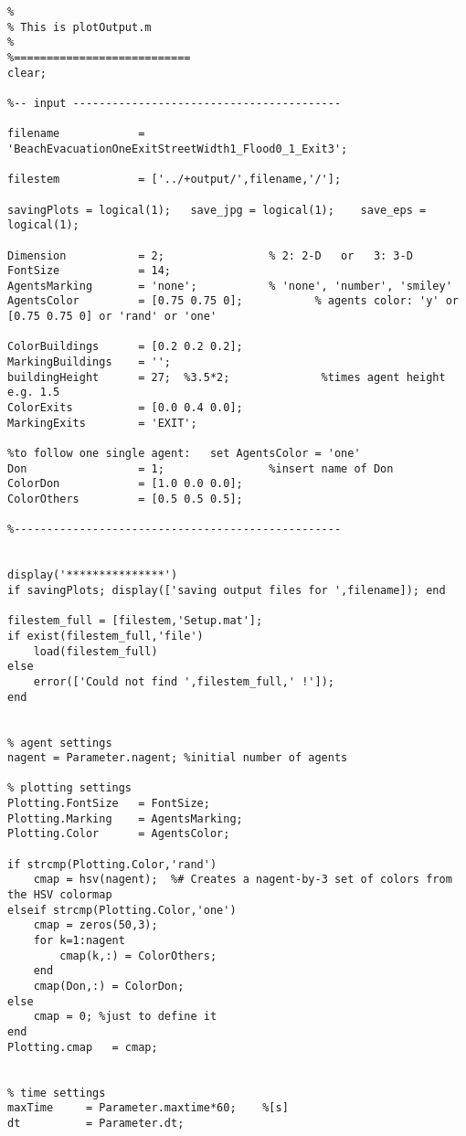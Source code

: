 \lstset{basicstyle=\footnotesize\ttfamily}
    
\begin{lstlisting}[breaklines]
%===========================
% 
% This is plotOutput.m
% 
%=========================== 
clear;

%-- input -----------------------------------------

filename            = 'BeachEvacuationOneExitStreetWidth1_Flood0_1_Exit3';

filestem            = ['../+output/',filename,'/'];

savingPlots = logical(1);   save_jpg = logical(1);    save_eps = logical(1);

Dimension           = 2;                % 2: 2-D   or   3: 3-D
FontSize            = 14;
AgentsMarking       = 'none';       	% 'none', 'number', 'smiley'
AgentsColor         = [0.75 0.75 0];           % agents color: 'y' or [0.75 0.75 0] or 'rand' or 'one'

ColorBuildings      = [0.2 0.2 0.2];
MarkingBuildings    = '';
buildingHeight      = 27;  %3.5*2;              %times agent height e.g. 1.5
ColorExits          = [0.0 0.4 0.0];
MarkingExits        = 'EXIT';

%to follow one single agent:   set AgentsColor = 'one'
Don                 = 1;                %insert name of Don
ColorDon            = [1.0 0.0 0.0];
ColorOthers         = [0.5 0.5 0.5];

%--------------------------------------------------


display('***************')
if savingPlots; display(['saving output files for ',filename]); end

filestem_full = [filestem,'Setup.mat'];
if exist(filestem_full,'file')
    load(filestem_full)
else
    error(['Could not find ',filestem_full,' !']);
end


% agent settings
nagent = Parameter.nagent; %initial number of agents

% plotting settings
Plotting.FontSize	= FontSize;
Plotting.Marking  	= AgentsMarking;
Plotting.Color    	= AgentsColor;

if strcmp(Plotting.Color,'rand')
    cmap = hsv(nagent);  %# Creates a nagent-by-3 set of colors from the HSV colormap
elseif strcmp(Plotting.Color,'one')
    cmap = zeros(50,3);
    for k=1:nagent
        cmap(k,:) = ColorOthers;
    end
    cmap(Don,:) = ColorDon;
else
    cmap = 0; %just to define it
end
Plotting.cmap   = cmap;


% time settings
maxTime     = Parameter.maxtime*60;    %[s]
dt          = Parameter.dt;
 

\end{lstlisting}
